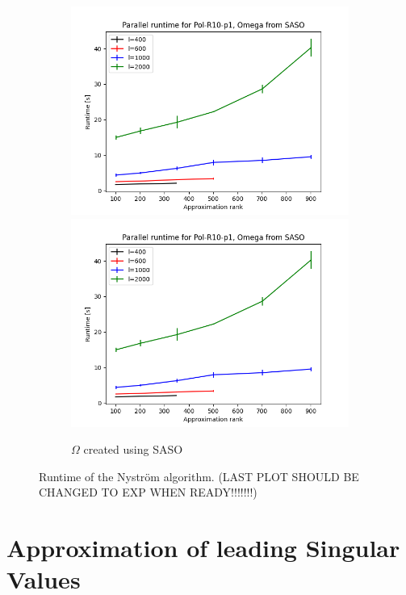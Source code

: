 \documentclass{article}
\theoremstyle{definition}
\begin{document}
\begin{figure}
\begin{subfigure}[t]{0.4\textwidth}
    \includegraphics[width=\textwidth]{plots/runtime/runtime_par_Pol-R10-p1_SASO.png}
    \includegraphics[width=\textwidth]{plots/runtime/runtime_par_Pol-R10-p1_SASO.png}
    \caption{$\Omega$ created using SASO}
\end{subfigure}\hfill
\caption{Runtime of the Nyström algorithm. (LAST PLOT SHOULD BE CHANGED TO EXP WHEN READY!!!!!!!)}
\label{fig:Runtime}
\end{figure}

\section{Approximation of leading Singular Values}
\end{document}
